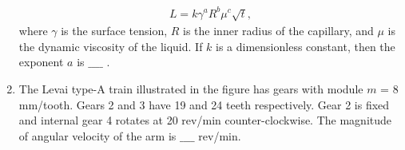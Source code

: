 \documentclass[journal]{IEEEtran}
\begin{document}
\begin{enumerate}
\begin{align*}
    L = k\gamma^aR^b\mu^c\sqrt{t},
\end{align*}
where $\gamma$ is the surface tension, $R$ is the inner radius of the capillary, and $\mu$ is the dynamic viscosity of the liquid. If $k$ is a dimensionless constant, then the exponent $a$ is $\_\_\_\_$ . \\
\item The Levai type-A train illustrated in the figure has gears with module
$m$ = 8 mm/tooth. Gears 2 and 3 have 19 and 24 teeth respectively. Gear 2 is
fixed and internal gear 4 rotates at 20 rev/min counter-clockwise. The magnitude of angular velocity of the arm is $\_\_\_\_$ rev/min. 
\begin{figure}[!ht]
\centering
\resizebox{0.5\textwidth}{!}{%

}%
\end{figure}\\
			 \end{enumerate}
			 
\end{document}
